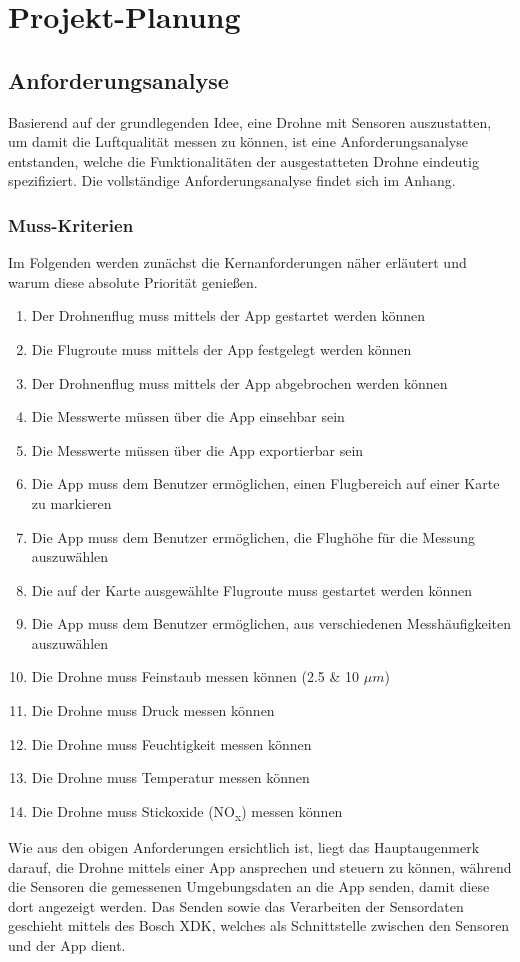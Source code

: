 
\chapter{Projekt-Planung}\label{cha:Planung}
\section{Anforderungsanalyse}\label{sec:Anforderungsanalyse}
Basierend auf der grundlegenden Idee, eine Drohne mit Sensoren auszustatten, um damit die Luftqualität messen zu können, ist eine Anforderungsanalyse entstanden, welche die Funktionalitäten der ausgestatteten Drohne eindeutig spezifiziert. Die vollständige Anforderungsanalyse findet sich im Anhang.
\subsection{Muss-Kriterien}\label{subsec:MussKrit}
Im Folgenden werden zunächst die Kernanforderungen näher erläutert und warum diese absolute Priorität genießen.
\newline
\begin{enumerate}[label=\roman*.]
	\item Der Drohnenflug muss mittels der App gestartet werden können
	\item Die Flugroute muss mittels der App festgelegt werden können
	\item Der Drohnenflug muss mittels der App abgebrochen werden können
	\item Die Messwerte müssen über die App einsehbar sein
	\item Die Messwerte müssen über die App exportierbar sein
	\item Die App muss dem Benutzer ermöglichen, einen Flugbereich auf einer Karte zu markieren
	\item Die App muss dem Benutzer ermöglichen, die Flughöhe für die Messung auszuwählen
	\item Die auf der Karte ausgewählte Flugroute muss gestartet werden können
	\item Die App muss dem Benutzer ermöglichen, aus verschiedenen Messhäufigkeiten auszuwählen
	\item Die Drohne muss Feinstaub messen können (2.5 \& 10 $\mu m$)
	\item Die Drohne muss Druck messen können
	\item Die Drohne muss Feuchtigkeit messen können
	\item Die Drohne muss Temperatur messen können
	\item Die Drohne muss Stickoxide (NO\textsubscript{x}) messen können	
\end{enumerate}
Wie aus den obigen Anforderungen ersichtlich ist, liegt das Hauptaugenmerk darauf, die Drohne mittels einer App ansprechen und steuern zu können, während die Sensoren die gemessenen Umgebungsdaten an die App senden, damit diese dort angezeigt werden. Das Senden sowie das Verarbeiten der Sensordaten geschieht mittels des Bosch \acf{XDK}, welches als Schnittstelle zwischen den Sensoren und der App dient.
